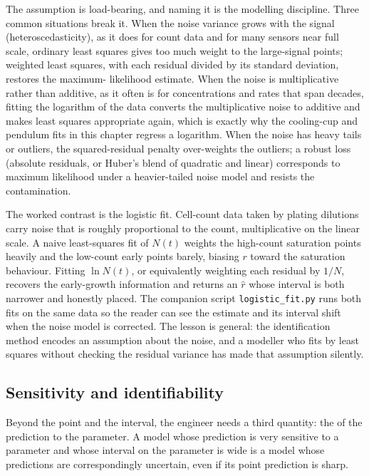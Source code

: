 The assumption is load-bearing, and naming it is the modelling
discipline. Three common situations break it. When the noise variance
grows with the signal (heteroscedasticity), as it does for count data
and for many sensors near full scale, ordinary least squares gives too
much weight to the large-signal points; weighted least squares, with
each residual divided by its standard deviation, restores the maximum-
likelihood estimate. When the noise is multiplicative rather than
additive, as it often is for concentrations and rates that span decades,
fitting the logarithm of the data converts the multiplicative noise to
additive and makes least squares appropriate again, which is exactly why
the cooling-cup and pendulum fits in this chapter regress a logarithm.
When the noise has heavy tails or outliers, the squared-residual
penalty over-weights the outliers; a robust loss (absolute residuals, or
Huber's blend of quadratic and linear) corresponds to maximum likelihood
under a heavier-tailed noise model and resists the contamination.

The worked contrast is the logistic fit. Cell-count data taken by
plating dilutions carry noise that is roughly proportional to the count,
multiplicative on the linear scale. A naive least-squares fit of $N(t)$
weights the high-count saturation points heavily and the low-count early
points barely, biasing $r$ toward the saturation behaviour. Fitting
$\ln N(t)$, or equivalently weighting each residual by $1/N$, recovers
the early-growth information and returns an $\hat r$ whose interval is
both narrower and honestly placed. The companion script
\texttt{logistic\_fit.py} runs both fits on the same data so the reader
can see the estimate and its interval shift when the noise model is
corrected. The lesson is general: the identification method encodes an
assumption about the noise, and a modeller who fits by least squares
without checking the residual variance has made that assumption silently.

\subsection{Sensitivity and identifiability}

Beyond the point and the interval, the engineer needs a third
quantity: the  of the prediction to the
parameter. A model whose prediction is very sensitive to a
parameter and whose interval on the parameter is wide is a model
whose predictions are correspondingly uncertain, even if its
point prediction is sharp.

